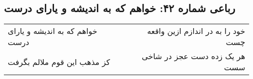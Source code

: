 \begin{center}
\section*{رباعی شماره ۴۲: خواهم که به اندیشه و یارای درست}
\label{sec:sh042}
\begin{longtable}{l p{0.5cm} r}
خواهم که به اندیشه و یارای درست
&&
خود را به در اندازم ازین واقعه چست
\\
کز مذهب این قوم ملالم بگرفت
&&
هر یک زده دست عجز در شاخی سست
\\
\end{longtable}
\end{center}
